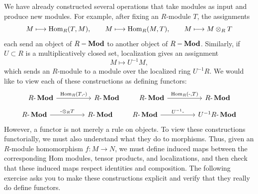 \documentclass[12pt,reqno]{amsart}
\begin{document}
We have already constructed several operations that take modules as input and produce new modules. For example, after fixing an $R$-module $T$, the assignments
\[
M \longmapsto \operatorname{Hom}_R(T,M),
\qquad
M \longmapsto \operatorname{Hom}_R(M,T),
\qquad
M \longmapsto M\otimes_R T
\]
each send an object of $R-\operatorname{\textbf{Mod}}$ to another object of $R-\operatorname{\textbf{Mod}}$. Similarly, if $U\subset R$ is a multiplicatively closed set, localization gives an assignment
\[
M \longmapsto U^{-1}M,
\]
which sends an $R$-module to a module over the localized ring $U^{-1}R$. We would like to view each of these constructions as defining functors:
\[
\begin{tikzcd}[row sep=.3em, column sep=5em]
{R\text{-}\Mod} \arrow[r, "{\Hom_R(T,\text{-})}"] & {R\text{-}\Mod}
\end{tikzcd}
\qquad
\begin{tikzcd}[row sep=.3em, column sep=5em]
{R\text{-}\Mod} \arrow[r, "{\Hom_R(\text{-},T)}"] & {R\text{-}\Mod}
\end{tikzcd}
\]
\[
\begin{tikzcd}[row sep=.3em, column sep=5em]
{R\text{-}\Mod} \arrow[r, "{\text{-}\otimes_{R}T}"] & {R\text{-}\Mod}
\end{tikzcd}
\qquad
\begin{tikzcd}[row sep=.3em, column sep=5em]
{R\text{-}\Mod} \arrow[r, "{U^{-1}\text{-}}"] & {U^{-1}R\text{-}\Mod}
\end{tikzcd}
\]
However, a functor is not merely a rule on objects. To view these constructions functorially, we must also understand what they do to morphisms. Thus, given an $R$-module homomorphism $f:M\to N$, we must define induced maps between the corresponding Hom modules, tensor products, and localizations, and then check that these induced maps respect identities and composition. The following exercise asks you to make these constructions explicit and verify that they really do define functors.


\hrulefill
\end{document}

